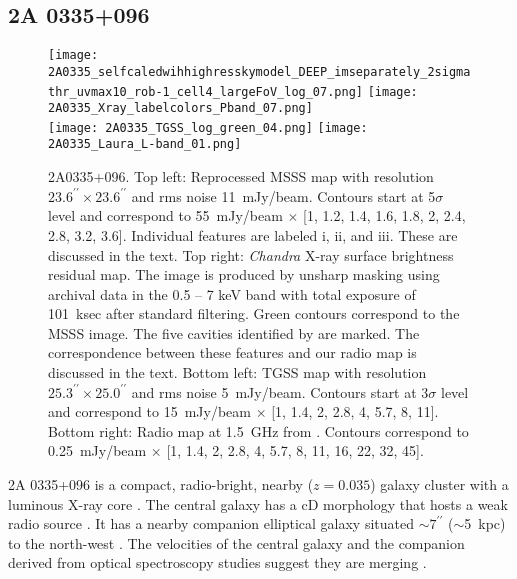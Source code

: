 \documentclass{aa}  %
\begin{document}
\subsection{2A 0335+096}
\label{lab:2A0335_resolved}


\begin{figure*}[t]
\begin{center}
\texttt{[image: 2A0335\_selfcaledwihhighresskymodel\_DEEP\_imseparately\_2sigmathr\_uvmax10\_rob-1\_cell4\_largeFoV\_log\_07.png]} 
\texttt{[image: 2A0335\_Xray\_labelcolors\_Pband\_07.png]} \\
\texttt{[image: 2A0335\_TGSS\_log\_green\_04.png]} 
\texttt{[image: 2A0335\_Laura\_L-band\_01.png]} 
\end{center}
\caption{\small  2A0335+096. Top left: Reprocessed MSSS map with resolution $23.6^{\prime\prime}\times23.6^{\prime\prime}$ and rms noise 11~mJy/beam. Contours start at 5$\sigma$ level and correspond to 55~mJy/beam $\times$ [1, 1.2, 1.4, 1.6, 1.8, 2, 2.4, 2.8, 3.2, 3.6]. Individual features are labeled i, ii, and iii. These are discussed in the text. Top right:  \textit{Chandra} X-ray surface brightness residual map. The image is produced by unsharp masking using archival data in the 0.5 -- 7 keV band with total exposure of 101~ksec after standard filtering. Green contours correspond to the MSSS image. The five cavities identified by \cite{Sanders2009} are marked. The correspondence between these features and our radio map is discussed in the text. Bottom left: TGSS map with resolution $25.3^{\prime\prime}\times25.0^{\prime\prime}$ and rms noise 5~mJy/beam. Contours  start at 3$\sigma$ level and correspond to 15~mJy/beam $\times$ [1, 1.4, 2, 2.8, 4, 5.7, 8, 11]. Bottom right: Radio map at 1.5~GHz from \cite{Birzan2008}. Contours correspond to 0.25~mJy/beam $\times$ [1, 1.4, 2, 2.8, 4, 5.7, 8, 11, 16, 22, 32, 45].
\label{fig:2a0335_all}}
\vspace{0.15in}
\end{figure*}


2A 0335+096 is a compact, radio-bright, nearby ($z = 0.035$) galaxy cluster with a luminous X-ray core \citep{Sanders2009}.
The central galaxy has a cD morphology that hosts a weak radio source \citep{Farage2012}.
It has a nearby companion elliptical galaxy situated  $\sim7^{\prime\prime}$ ($\sim$5~kpc) to the north-west \citep{Sanders2009}.
The velocities of the central galaxy and the companion derived from optical spectroscopy studies suggest they are merging \citep{Gelderman1996, Donahue2007, Hatch2007}. 
\end{document}
